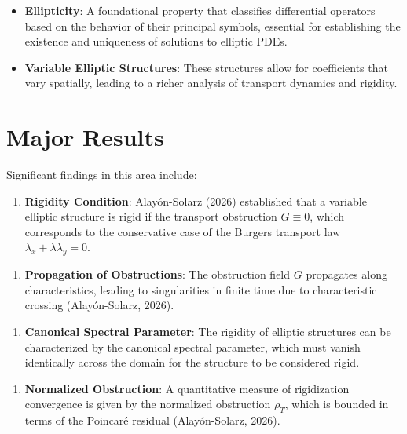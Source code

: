 \documentclass[11pt,a4paper]{article}
\begin{document}
\begin{itemize}
\item \textbf{Ellipticity}: A foundational property that classifies differential operators based on the behavior of their principal symbols, essential for establishing the existence and uniqueness of solutions to elliptic PDEs.
\end{itemize}

\begin{itemize}
\item \textbf{Variable Elliptic Structures}: These structures allow for coefficients that vary spatially, leading to a richer analysis of transport dynamics and rigidity.
\end{itemize}

\section{Major Results}

Significant findings in this area include:

\begin{enumerate}
\item \textbf{Rigidity Condition}: Alayón-Solarz (2026) established that a variable elliptic structure is rigid if the transport obstruction \( G \equiv 0 \), which corresponds to the conservative case of the Burgers transport law \( \lambda_x + \lambda \lambda_y = 0 \).
\end{enumerate}

\begin{enumerate}
\item \textbf{Propagation of Obstructions}: The obstruction field \( G \) propagates along characteristics, leading to singularities in finite time due to characteristic crossing (Alayón-Solarz, 2026).
\end{enumerate}

\begin{enumerate}
\item \textbf{Canonical Spectral Parameter}: The rigidity of elliptic structures can be characterized by the canonical spectral parameter, which must vanish identically across the domain for the structure to be considered rigid.
\end{enumerate}

\begin{enumerate}
\item \textbf{Normalized Obstruction}: A quantitative measure of rigidization convergence is given by the normalized obstruction \( \rho_T \), which is bounded in terms of the Poincaré residual (Alayón-Solarz, 2026).
\end{enumerate}
\end{document}
